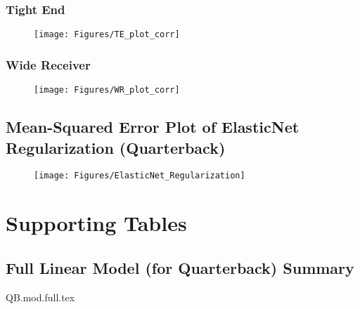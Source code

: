 \clearpage
\subsection{Tight End}
\begin{figure}[h]
	\centering
	\texttt{[image: Figures/TE\_plot\_corr]}
	\label{fig:teplotcorr}
\end{figure}

\subsection{Wide Receiver}
\begin{figure}[h]
	\centering
	\texttt{[image: Figures/WR\_plot\_corr]}
	\label{fig:wrplotcorr}
\end{figure}


\clearpage
\begin{landscape}
	\section{Mean-Squared Error Plot of ElasticNet Regularization (Quarterback)}
	\begin{figure}[h]
		\centering
		\texttt{[image: Figures/ElasticNet\_Regularization]}
		\label{fig:elasticnetregularization}
	\end{figure}
\end{landscape}




\chapter{Supporting Tables}
\label{app:supportingTables}

\section{Full Linear Model (for Quarterback) Summary}
\label{tab:full_lm_QB}
{QB.mod.full.tex}
